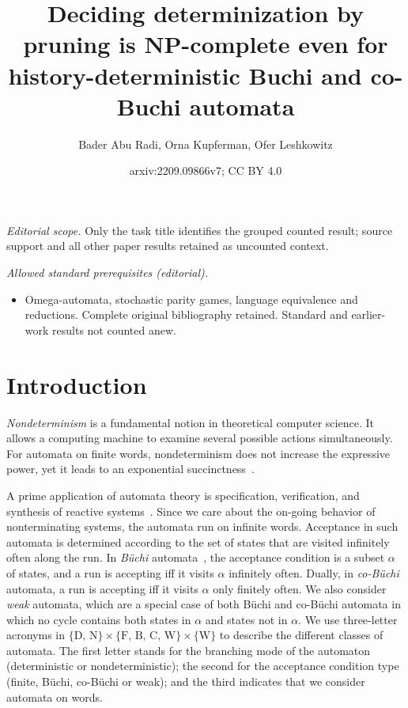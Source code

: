 \documentclass[10pt,a4paper]{amsart}
\title{Deciding determinization by pruning is NP-complete even for history-deterministic Buchi and co-Buchi automata}
\author{Bader Abu Radi, Orna Kupferman, Ofer Leshkowitz}
\date{arxiv:2209.09866v7; CC BY 4.0}
\theoremstyle{definition}
\numberwithin{equation}{section}
\newcommand{\buchi}{B\"uchi\xspace}
\begin{document}
\maketitle
\noindent\textit{Editorial scope.} Only the task title identifies the grouped counted result; source support and all other paper results retained as uncounted context.\par\medskip
\noindent\textit{Allowed standard prerequisites (editorial).}\begin{itemize}
\item Omega-automata, stochastic parity games, language equivalence and reductions. Complete original bibliography retained. Standard and earlier-work results not counted anew.
\end{itemize}\medskip
\section{Introduction}
\label{intro}
{\em Nondeterminism\/} is a fundamental notion in theoretical computer science. It allows a computing machine to examine several possible actions simultaneously. 
For automata on finite words, nondeterminism does not increase the expressive power, yet it leads to an exponential succinctness~\cite{RS59}. 

A prime application of automata theory is specification, verification, and synthesis of reactive systems~\cite{VW94,Kup18}.  Since we care about the on-going behavior of nonterminating  systems, the automata run on infinite words. Acceptance in such automata is determined according to the set of states that are visited infinitely often along the run. In {\em B\"uchi\/} automata~\cite{Buc62},
the acceptance condition is a subset $\alpha$ of states, and a run is accepting iff it visits $\alpha$ infinitely often. Dually, in {\em co-B\"uchi\/} automata, 
a run is accepting iff it visits $\alpha$ only finitely often. We also consider {\em weak\/} automata, which are a special case of both \buchi and co-\buchi automata in which no cycle contains both states in $\alpha$ and states not in $\alpha$. We use three-letter acronyms in $\{ \text{D, N} \} \times \{ \text{F, B, C, W}\} \times \{\text{W}\}$ to describe the different classes of automata. The first letter stands for the branching mode of the automaton (deterministic or nondeterministic); the second for the acceptance condition type (finite, \buchi, co-\buchi or weak); and the third indicates that we consider automata on words. 
\end{document}
